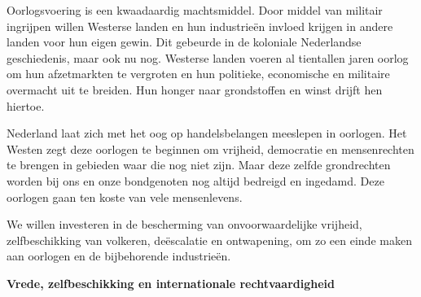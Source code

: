 Oorlogsvoering is een kwaadaardig machtsmiddel. Door middel van militair
ingrijpen willen Westerse landen en hun industrieën invloed krijgen in
andere landen voor hun eigen gewin. Dit gebeurde in de koloniale
Nederlandse geschiedenis, maar ook nu nog. Westerse landen voeren al
tientallen jaren oorlog om hun afzetmarkten te vergroten en hun
politieke, economische en militaire overmacht uit te breiden. Hun honger
naar grondstoffen en winst drijft hen hiertoe.

Nederland laat zich met het oog op handelsbelangen meeslepen in
oorlogen. Het Westen zegt deze oorlogen te beginnen om vrijheid,
democratie en mensenrechten te brengen in gebieden waar die nog niet
zijn. Maar deze zelfde grondrechten worden bij ons en onze bondgenoten
nog altijd bedreigd en ingedamd. Deze oorlogen gaan ten koste van vele
mensenlevens.

We willen investeren in de bescherming van onvoorwaardelijke vrijheid,
zelfbeschikking van volkeren, deëscalatie en ontwapening, om zo een
einde maken aan oorlogen en de bijbehorende industrieën.

\textbf{Vrede, zelfbeschikking en internationale rechtvaardigheid}

